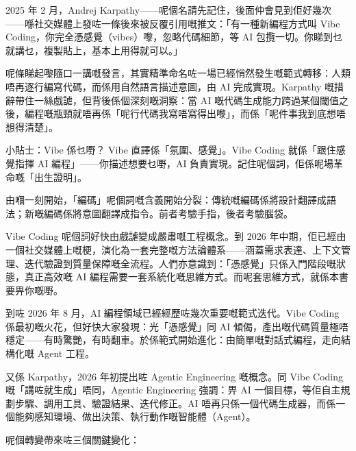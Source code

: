 


2025 年 2 月，Andrej Karpathy——呢個名請先記住，後面仲會見到佢好幾次——喺社交媒體上發咗一條後來被反覆引用嘅推文：「有一種新編程方式叫 Vibe Coding，你完全憑感覺（vibes）嚟，忽略代碼細節，等 AI 包攬一切。你睇到乜就講乜，複製貼上，基本上用得就可以。」

呢條睇起嚟隨口一講嘅發言，其實精準命名咗一場已經悄然發生嘅範式轉移：人類唔再逐行編寫代碼，而係用自然語言描述意圖，由 AI 完成實現。Karpathy 嘅措辭帶住一絲戲謔，但背後係個深刻嘅洞察：當 AI 嘅代碼生成能力跨過某個閾值之後，編程嘅瓶頸就唔再係「呢行代碼我寫唔寫得出嚟」，而係「呢件事我到底想唔想得清楚」。

\begin{tcbinfo}{小貼士：Vibe 係乜嘢？}
Vibe 直譯係「氛圍、感覺」。Vibe Coding 就係「跟住感覺指揮 AI 編程」——你描述想要乜嘢，AI 負責實現。記住呢個詞，佢係呢場革命嘅「出生證明」。

\end{tcbinfo}

由嗰一刻開始，「編碼」呢個詞嘅含義開始分裂：傳統嘅編碼係將設計翻譯成語法；新嘅編碼係將意圖翻譯成指令。前者考驗手指，後者考驗腦袋。

Vibe Coding 呢個詞好快由戲謔變成嚴肅嘅工程概念。到 2026 年中期，佢已經由一個社交媒體上嘅梗，演化為一套完整嘅方法論體系——涵蓋需求表達、上下文管理、迭代驗證到質量保障嘅全流程。人們亦意識到：「憑感覺」只係入門階段嘅狀態，真正高效嘅 AI 編程需要一套系統化嘅思維方式。而呢套思維方式，就係本書要畀你嘅嘢。


到咗 2026 年 8 月，AI 編程領域已經經歷咗幾次重要嘅範式迭代。Vibe Coding 係最初嘅火花，但好快大家發現：光「憑感覺」同 AI 傾偈，產出嘅代碼質量極唔穩定——有時驚艷，有時翻車。於係範式開始進化：由簡單嘅對話式編程，走向結構化嘅 Agent 工程。

又係 Karpathy，2026 年初提出咗 Agentic Engineering 嘅概念。同 Vibe Coding 嘅「講咗就生成」唔同，Agentic Engineering 強調：畀 AI 一個目標，等佢自主規劃步驟、調用工具、驗證結果、迭代修正。AI 唔再只係一個代碼生成器，而係一個能夠感知環境、做出決策、執行動作嘅智能體（Agent）。

呢個轉變帶來咗三個關鍵變化：

